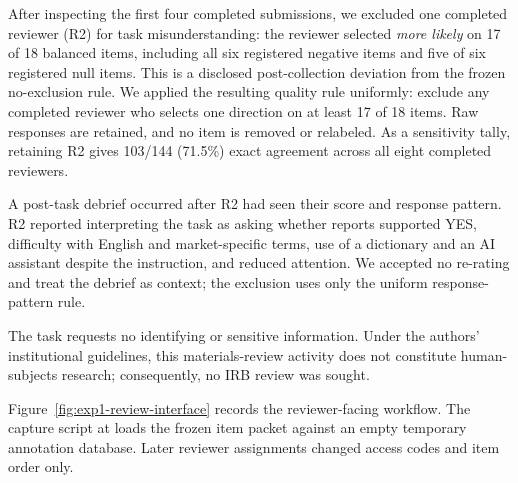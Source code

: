 \begin{center}
\begin{minipage}{\linewidth}
\centering
\scriptsize
\setlength{\tabcolsep}{3pt}
\label{tab:stage3-items}

\end{minipage}
\end{center}


After inspecting the first four completed submissions, we excluded one completed
reviewer (R2) for task misunderstanding: the reviewer selected \emph{more
likely} on 17 of 18 balanced items, including all six registered negative items
and five of six registered null items. This is a disclosed post-collection
deviation from the frozen no-exclusion rule. We applied the resulting quality
rule uniformly: exclude any completed reviewer who selects one direction on at
least 17 of 18 items. Raw responses are retained, and no item is removed or
relabeled. As a sensitivity tally, retaining R2 gives 103/144 (71.5\%) exact
agreement across all eight completed reviewers.

A post-task debrief occurred after R2 had seen their score and response pattern.
R2 reported interpreting the task as asking whether reports supported YES,
difficulty with English and market-specific terms, use of a dictionary and an
AI assistant despite the instruction, and reduced attention. We accepted no
re-rating and treat the debrief as context; the exclusion uses only the uniform
response-pattern rule.


The task requests no identifying or sensitive information. Under the authors'
institutional guidelines, this materials-review activity does not constitute
human-subjects research; consequently, no IRB review was sought.

Figure~\ref{fig:exp1-review-interface} records the reviewer-facing workflow. The
capture script at
loads the frozen item packet against an empty temporary annotation database.
Later reviewer assignments changed access codes and item order only.


